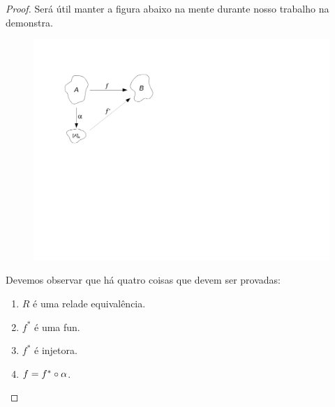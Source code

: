 \begin{proof}
Ser\'a \'util manter a figura abaixo na mente durante nosso trabalho na demonstra\caoi.

\begin{figure}[h]
\begin{center}
\includegraphics[width=15cm,trim={1.3cm 11.1cm 16cm 2.3cm},clip]{./figuras/figure28.pdf}
\end{center}
\end{figure}

Devemos observar que h\'a quatro coisas que devem ser provadas:
\begin{enumerate}[{\bf a)}]
\item $R$ \'e uma rela\cao de equival\^encia.
\item $f^{\ast}$ \'e uma fun\caoi.
\item $f^{\ast}$ \'e injetora.
\item $f=f^{\ast}\circ\alpha$. 
\end{enumerate}


\end{proof}
